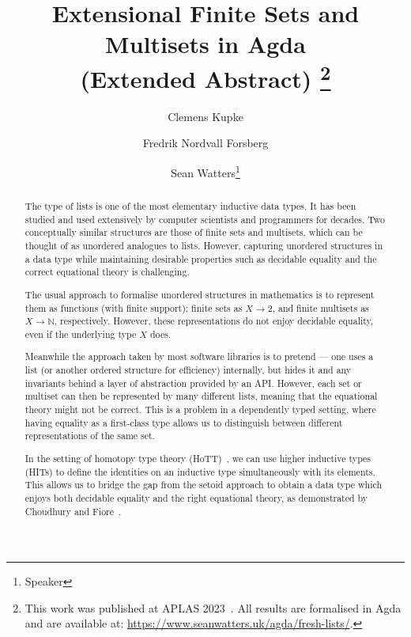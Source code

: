 \documentclass[a4paper]{easychair}
\title{Extensional Finite Sets and Multisets in Agda \\ (Extended Abstract)
\footnote{
This work was published at APLAS 2023~\cite{freshlists}.
All results are formalised in Agda and are available at:
\url{https://www.seanwatters.uk/agda/fresh-lists/}.
}}
\author{
Clemens Kupke
\and
Fredrik Nordvall Forsberg
\and
Sean Watters\thanks{Speaker}
}
\institute{
  University of Strathclyde, UK\\
  \email{\{clemens.kupke, fredrik.nordvall-forsberg, sean.watters\}@strath.ac.uk}
 }
\begin{document}
\maketitle


\begin{abstract}

The type of lists is one of the most elementary inductive data types.
It has been studied and used extensively by computer scientists and programmers for decades.
Two conceptually similar structures are those of finite sets and multisets, which can be thought of as unordered analogues to lists.
However, capturing unordered structures in a data type while maintaining desirable properties such as decidable equality and the correct equational theory is challenging.

The usual approach to formalise unordered structures in mathematics
is to represent them as functions (with finite support): finite sets as $X \to 2$, and finite multisets as $X \to \mathbb{N}$, respectively.
However, these representations do not enjoy decidable equality, even if the underlying type $X$ does.

Meanwhile the approach taken by most software libraries is to pretend --- one uses a list (or another ordered structure for efficiency) internally, but hides it and any invariants behind a layer of abstraction provided by an API.
However, each set or multiset can then be represented by many different lists,
meaning that the equational theory might not be correct. This is a problem
in a dependently typed setting, where
having equality as a first-class type allows us to
distinguish between different representations of the same set.


In the setting of homotopy type theory (HoTT)~\cite{hottbook}, we can use higher inductive types (HITs) to define the identities on an inductive type simultaneously with its elements.
This allows us to bridge the gap from the setoid approach to obtain a data type which enjoys both decidable equality and the right equational theory, as demonstrated by Choudhury and Fiore~\cite{choudhuryfiore2023freecommmon}.


\end{abstract}
\end{document}
